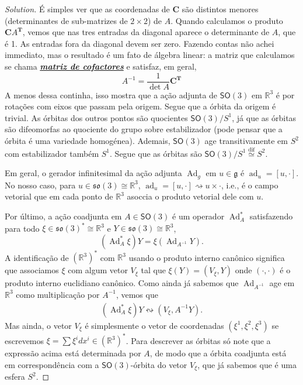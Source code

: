 \begin{proof}[Solution]
É simples ver que as coordenadas de $\mathbf{C}$ são distintos menores (determinantes de sub-matrizes de $2\times 2$) de $A$. Quando calculamos o produto $\mathbf{C} A^{\mathbf{T}}$, vemos que nas tres entradas da diagonal aparece o determinante de $A$, que é 1. As entradas fora da diagonal devem ser zero. Fazendo contas não achei immediato, mas o resultado é um fato de álgebra linear: a matriz que calculamos se chama \href{https://en.wikipedia.org/wiki/Minor_(linear_algebra)#Cofactor_expansion_of_the_determinant}{\textit{\textbf{matriz de cofactores}}} e satisfaz, em geral,
\[A^{-1}=\frac{1}{\det A}\mathbf{C}^{\mathbf{T}}\]
A menos dessa continha, isso mostra que a ação adjunta de $\mathsf{SO}(3)$ em $\mathbb{R}^{3}$ é por rotações com eixos que passam pela origem. Segue que a órbita da origem é trivial. As órbitas dos outros pontos são quocientes $\mathsf{SO}(3)/S^1$, já que as órbitas são difeomorfas ao quociente do grupo sobre estabilizador (pode pensar que a órbita é uma variedade homogénea). Ademais, $\mathsf{SO}(3)$ age transitivamente em $S^2$ com estabilizador também $S^1$. Segue que as órbitas são $\mathsf{SO}(3)/S^1\overset{\operatorname{dif}}{\simeq} S^2$.

Em geral, o gerador infinitesimal da ação adjunta $\operatorname{Ad}_g$ em $u\in\mathfrak{g}$ é $\operatorname{ad}_u=[u,\cdot]$. No nosso caso, para $u\in\mathfrak{so}(3) \cong \mathbb{R}^{3}$, $\operatorname{ad}_u=[u,\cdot ]\rightsquigarrow u\times \cdot$, i.e., é o campo vetorial que em cada ponto de $\mathbb{R}^{3}$ asoccia o produto vetorial dele com $u$.

Por último, a ação coadjunta em $A\in\mathsf{SO}(3)$ é um operador $\operatorname{Ad}^*_A$ satisfazendo para todo $\xi\in  \mathfrak{so}(3)^* \cong \mathbb{R}^{3}$ e $Y\in \mathfrak{so}(3) \cong \mathbb{R}^{3}$,
\[(\operatorname{Ad}^* _A\xi)Y=\xi(\operatorname{Ad}_{A^{-1}}Y).\]
A identificação de $(\mathbb{R}^3)^*$ com $\mathbb{R}^3$ usando o produto interno canônico significa que associamos $\xi$ com algum vetor $V_\xi$ tal que $\xi(Y)=(V_\xi,Y)$ onde $(\cdot,\cdot)$ é o produto interno euclidiano canônico. Como ainda já sabemos que $\operatorname{Ad}_{A^{-1}}$ age em $\mathbb{R}^{3}$ como multiplicação por $A^{-1}$, vemos que
\begin{align*}
	(\operatorname{Ad}^*_A\xi)Y \leftrightsquigarrow (V_\xi,A^{-1}Y).
\end{align*}
Mas ainda, o vetor $V_\xi$ é simplesmente o vetor de coordenadas $(\xi^1,\xi^2,\xi^3)$ se escrevemos $\xi=\sum \xi^idx^i\in (\mathbb{R}^3)^*$. Para descrever as órbitas só note que a expressão acima está determinada por $A$, de modo que a  órbita coadjunta está em correspondência com a $\mathsf{SO}(3)$-órbita do vetor $V_\xi$, que já sabemos que é uma esfera $S^2$.


\end{proof}
